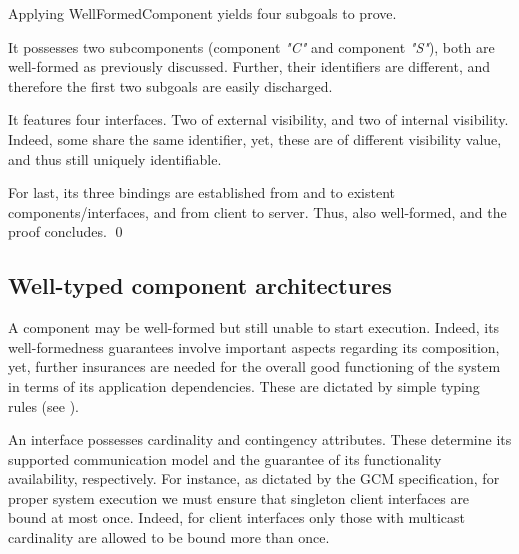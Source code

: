 	\begin{lemma} \label{th:wflemmaexN} 
					
	
		Applying \textsf{WellFormedComponent} yields four subgoals to prove.	
		
		It possesses two subcomponents (\textsf{component} \textit{"C"} 
		and \textsf{component} \textit{"S"}), both are well-formed as previously discussed.	Further,
		their identifiers are different, and therefore the first two subgoals are easily discharged.
		
			It features four interfaces. Two of external visibility, and two of internal visibility.
		Indeed,	 some share the same identifier, yet, these are of different visibility value, and thus still
		uniquely identifiable.
		
			For last, its three bindings are established from and to existent components/interfaces, and from
			client to server. Thus, also well-formed, and the proof concludes. 	\qed
	\end{lemma}	
	

	
	
\subsection{Well-typed component architectures}
\label{sub:welltyped}

	A \textsf{component} may be well-formed but still unable to start execution. Indeed, its
	 well-formedness guarantees involve important aspects regarding its composition, yet,
	 further insurances are needed for the overall good functioning of the system in terms of its 
	 application dependencies. These are dictated by simple typing rules (see \cite[p. 22]{ETSI2009:GCMADL}).	 
	 
		An \textsf{interface} possesses \textsf{cardinality} and \textsf{contingency} attributes. These determine
	its supported communication model and the guarantee of its functionality availability, respectively.
	For instance, as dictated by the \ac{GCM} specification, for proper system execution 
	we must ensure that \textsf{singleton} \textsf{client} \textsf{interface}s 
	are bound at most once. Indeed, for \textsf{client} \textsf{interface}s only those with \textsf{multicast} \textsf{cardinality}
	are allowed to be bound more than once. 
	
